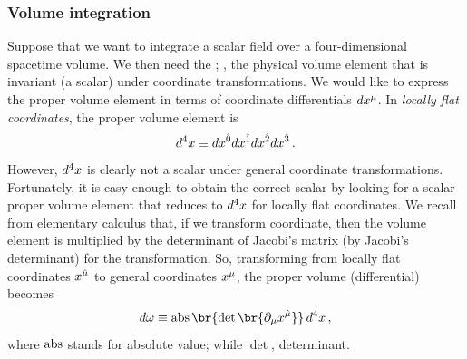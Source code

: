 \subsubsection{Volume integration}
%
 Suppose that we want to integrate a scalar field over a four-dimensional spacetime volume. We then need the ; \ie, the physical volume element that is invariant (a scalar) under coordinate transformations. We would like to express the proper volume element in terms of coordinate differentials $d\tvec\pos\mu$. In \emph{locally flat coordinates}, the proper volume element is
%
\begin{equation*}
  \tvolel 4 \defas d\tvec\pos{\ridx 0} d\tvec\pos{\ridx 1} d\tvec\pos{\ridx 2} d\tvec\pos{\ridx 3}\,.
\end{equation*}
%
 However, $d^{4}x$ is clearly not a scalar under general coordinate transformations. Fortunately, it is easy enough to obtain the correct scalar by looking for a scalar proper volume element that reduces to $d^{4}x$ for locally flat coordinates. We recall from elementary calculus that, if we transform coordinate, then the volume element is multiplied by the determinant of Jacobi's matrix (by Jacobi's determinant) for the transformation. So, transforming from locally flat coordinates $\tvec\pos{\ridx\mu}$ to general coordinates $\tvec\pos\mu$, the proper volume (differential) becomes
%
\begin{equation}\label{eq:propervolumedifferential}
  d\vol \defas \abs\br{\det\br{\ipd\mu\tvec\pos{\ridx\mu}}}\,\tvolel 4\,,
\end{equation}
%
where $\operatorname{abs}$ stands for absolute value; while $\det$, determinant.

